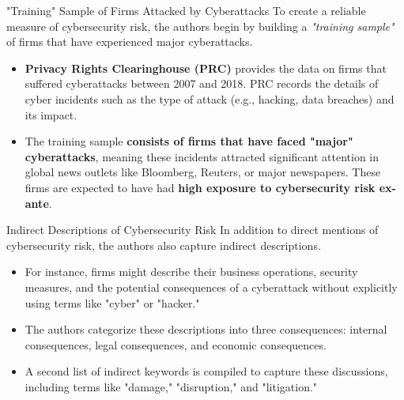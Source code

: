 \documentclass[11pt]{beamer}
\begin{document}
\begin{frame}{"Training" Sample of Firms Attacked by Cyberattacks}
To create a reliable measure of cybersecurity risk, the authors begin by building a \textit{ "training sample"} of firms that have experienced major cyberattacks.

	\begin{itemize}
		\item \textbf{Privacy Rights Clearinghouse (PRC)} provides the data on firms that suffered cyberattacks between 2007 and 2018. PRC records the details of cyber incidents such as the type of attack (e.g., hacking, data breaches) and its impact.

		\item The training sample \textbf{consists of firms that have faced "major" cyberattacks}, meaning these incidents attracted significant attention in global news outlets like Bloomberg, Reuters, or major newspapers. These firms are expected to have had \textbf{high exposure to cybersecurity risk ex-ante}.

	\end{itemize}
\end{frame}
\begin{frame}{Indirect Descriptions of Cybersecurity Risk}
In addition to direct mentions of cybersecurity risk, the authors also capture indirect descriptions.

	\begin{itemize}
		\item For instance, firms might describe their business operations, security measures, and the potential consequences of a cyberattack without explicitly using terms like "cyber" or "hacker."

		\item The authors categorize these descriptions into three consequences: internal consequences, legal consequences, and economic consequences.

		\item A second list of indirect keywords is compiled to capture these discussions, including terms like "damage," "disruption," and "litigation."

	\end{itemize}
\end{frame}
\end{document}
